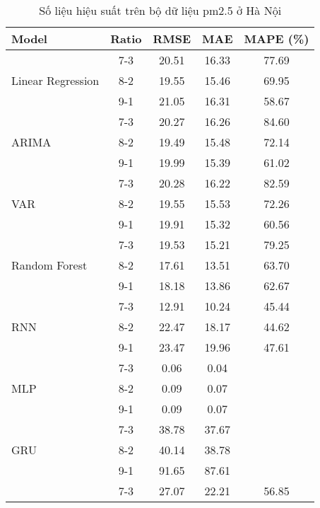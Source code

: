 \begin{table}[h!]
    \centering
    \caption{Số liệu hiệu suất trên bộ dữ liệu pm2.5 ở Hà Nội}
    \begin{tabular}{|l|c|c|c|c|}
    \hline
    \rowcolor{orange!30} \textbf{Model} & \textbf{Ratio} & \textbf{RMSE} & \textbf{MAE} & \textbf{MAPE (\%)} \\ \hline
    \rowcolor{white} & 7-3 & 20.51 & 16.33 & 77.69 \\ 
    \rowcolor{white} Linear Regression & 8-2 & 19.55 & 15.46 & 69.95 \\ 
    \rowcolor{white} & 9-1 & 21.05 & 16.31 & 58.67 \\ \hline
    \rowcolor{white} & 7-3 & 20.27 & 16.26 & 84.60 \\ 
    \rowcolor{white} ARIMA & 8-2 & 19.49 & 15.48 & 72.14 \\ 
    \rowcolor{white} & 9-1 & 19.99 & 15.39 & 61.02 \\ \hline
    \rowcolor{white} & 7-3 & 20.28 & 16.22 & 82.59 \\ 
    \rowcolor{white} VAR & 8-2 & 19.55 & 15.53 & 72.26 \\ 
    \rowcolor{white} & 9-1 & 19.91 & 15.32 & 60.56 \\ \hline
    \rowcolor{white} & 7-3 & 19.53 & 15.21 & 79.25 \\ 
    \rowcolor{white} Random Forest & 8-2 & 17.61 & 13.51 & 63.70 \\ 
    \rowcolor{white} & 9-1 & 18.18 & 13.86 & 62.67 \\ \hline
    \rowcolor{white} & 7-3 & 12.91 & 10.24 & 45.44 \\ 
    \rowcolor{white} RNN & 8-2 & 22.47 & 18.17 & 44.62 \\ 
    \rowcolor{white} & 9-1 & 23.47 & 19.96 & 47.61 \\ \hline
    \rowcolor{white} & 7-3 & 0.06 & 0.04 &  \\ 
    \rowcolor{white} MLP & 8-2 & 0.09 & 0.07 &  \\ 
    \rowcolor{white} & 9-1 & 0.09 & 0.07 &  \\ \hline
    \rowcolor{white} & 7-3 & 38.78 & 37.67 &  \\ 
    \rowcolor{white} GRU & 8-2 & 40.14 & 38.78 &  \\ 
    \rowcolor{white} & 9-1 & 91.65 & 87.61 &  \\ \hline
    \rowcolor{white} & 7-3 & 27.07 & 22.21 & 56.85 \\ 

\end{tabular}
\end{table}
